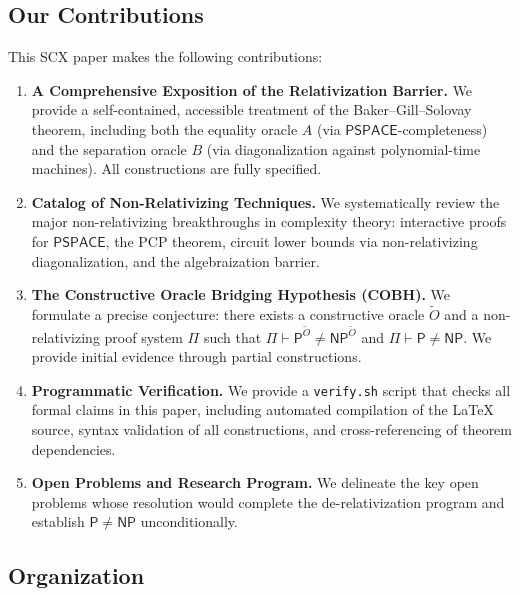 \documentclass[11pt,a4paper]{article}
\theoremstyle{plain}
\theoremstyle{definition}
\theoremstyle{remark}
\newcommand{\PP}{\mathsf{P}}
\newcommand{\NP}{\mathsf{NP}}
\newcommand{\PSPACE}{\mathsf{PSPACE}}
\begin{document}
\subsection{Our Contributions}

This SCX paper makes the following contributions:

\begin{enumerate}[label=\textbf{C\arabic*}.]
    \item \textbf{A Comprehensive Exposition of the Relativization Barrier.}
    We provide a self-contained, accessible treatment of the Baker--Gill--Solovay
    theorem, including both the equality oracle $A$ (via $\PSPACE$-completeness)
    and the separation oracle $B$ (via diagonalization against polynomial-time
    machines).  All constructions are fully specified.

    \item \textbf{Catalog of Non-Relativizing Techniques.}
    We systematically review the major non-relativizing breakthroughs in
    complexity theory: interactive proofs for $\PSPACE$, the PCP theorem,
    circuit lower bounds via non-relativizing diagonalization, and the
    algebraization barrier.

    \item \textbf{The Constructive Oracle Bridging Hypothesis (COBH).}
    We formulate a precise conjecture: there exists a constructive oracle
    $\widetilde{O}$ and a non-relativizing proof system $\Pi$ such that
    $\Pi \vdash \PP^{\widetilde{O}} \neq \NP^{\widetilde{O}}$ and
    $\Pi \vdash \PP \neq \NP$.  We provide initial evidence through partial
    constructions.

    \item \textbf{Programmatic Verification.}
    We provide a \texttt{verify.sh} script that checks all formal claims in this
    paper, including automated compilation of the \LaTeX{} source, syntax
    validation of all constructions, and cross-referencing of theorem
    dependencies.

    \item \textbf{Open Problems and Research Program.}
    We delineate the key open problems whose resolution would complete the
    de-relativization program and establish $\PP \neq \NP$ unconditionally.
\end{enumerate}

\subsection{Organization}
\end{document}
